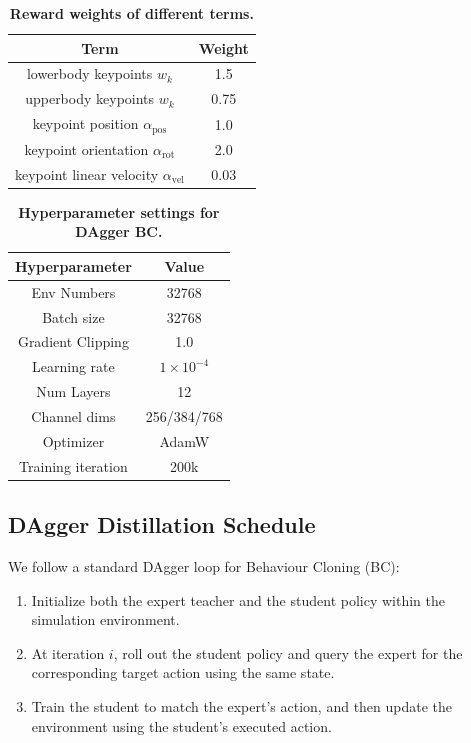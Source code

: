 \begin{table}[t!]
    \centering
    \caption{\textbf{Reward weights of different terms.}}
    \label{tab:reward_weights}
    \begin{tabular}{cc}
    \toprule
    Term & Weight \\
    \midrule
    lowerbody keypoints $w_k$ & 1.5 \\
    upperbody keypoints $w_k$ & 0.75 \\
    keypoint position $\alpha_{\text{pos}}$ & 1.0 \\
    keypoint orientation $\alpha_{\text{rot}}$ & 2.0 \\
    keypoint linear velocity $\alpha_{\text{vel}}$ & 0.03 \\
    \bottomrule
    \end{tabular}
\end{table}

\begin{table}[t!]
    \centering
    \caption{\textbf{Hyperparameter settings for DAgger BC.}}
    \label{tab:ppo_hyperparams}
    \begin{tabular}{cc}
    \toprule
    Hyperparameter & Value \\
    \midrule
    Env Numbers & 32768 \\
    Batch size & 32768 \\
    Gradient Clipping & 1.0 \\
    Learning rate & $1\times10^{-4}$ \\
    Num Layers & 12 \\
    Channel dims & 256/384/768 \\
    Optimizer & AdamW \\
    Training iteration & 200k \\
    \bottomrule
    \end{tabular}
\end{table}


\subsection{DAgger Distillation Schedule}
\label{subsec:dagger_details}

We follow a standard DAgger loop for Behaviour Cloning (BC):
\begin{enumerate}[leftmargin=1.5em]
\item Initialize both the expert teacher and the student policy within the simulation environment.
\item At iteration $i$, roll out the student policy and query the expert for the corresponding target action using the same state.
\item Train the student to match the expert’s action, and then update the environment using the student’s executed action.
\end{enumerate}

